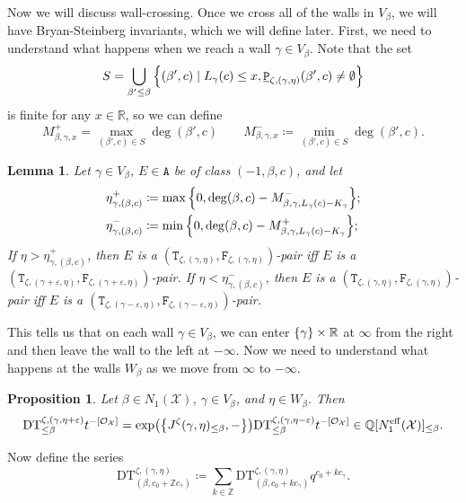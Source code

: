 \documentclass{amsart}
\newtheorem{prop}[thm]{Proposition}
\newtheorem{lem}[thm]{Lemma}
\theoremstyle{definition}
\theoremstyle{remark}
\theoremstyle{plain}
\theoremstyle{definition}
\theoremstyle{remark}
\newcommand{\R}{\mathbb{R}}
\newcommand{\Z}{\mathbb{Z}}
\newcommand{\Q}{\mathbb{Q}}
\newcommand{\ep}{\varepsilon}
\newcommand{\mc}[1]{\mathcal{#1}}
\newcommand{\mr}[1]{\mathrm{#1}}
\newcommand{\mt}[1]{\mathtt{#1}}
\newcommand{\ul}[1]{\underline{#1}}
\newcommand{\1}{\mathbf{1}}
\newcommand{\2}{\mathbf{2}}
\newcommand{\3}{\mathbf{3}}
\begin{document}
Now we will discuss wall-crossing. Once we cross all of the walls in $V_{\beta}$, we will have Bryan-Steinberg invariants, which we will define later. First, we need to understand what happens when we reach a wall $\gamma \in V_{\beta}$. Note that the set 
\[ S = \bigcup_{\beta' \leq \beta} \qty{(\beta', c) \mid L_{\gamma}(c) \leq x, \mt{\ul{P}}_{\zeta, (\gamma,\eta)}(\beta',c) \neq \emptyset} \]
is finite for any $x \in \R$, so we can define
\[ M_{\beta,\gamma,x}^+ = \max_{(\beta',c) \in S} \deg(\beta',c) \qquad M_{\beta, \gamma,x}^- \coloneqq \min_{(\beta',c) \in S} \deg(\beta', c). \]

\begin{lem}
    Let $\gamma \in V_{\beta}$, $E \in \mt{A}$ be of class $(-1, \beta, c)$, and let
    \begin{align*}
        \eta_{\gamma, (\beta,c)}^+ &\coloneqq \max \qty{0, \deg(\beta, c) - M^-_{\beta, \gamma,L_{\gamma}(c) - K_{\gamma}}}; \\
        \eta_{\gamma, (\beta,c)}^- &\coloneqq \min \qty{0, \deg(\beta, c) - M^+_{\beta, \gamma,L_{\gamma}(c) - K_{\gamma}}};
    \end{align*}
    If $\eta > \eta^+_{\gamma, (\beta, c)}$, then $E$ is a $(\mt{T}_{\zeta, (\gamma, \eta)}, \mt{F}_{\zeta, (\gamma,\eta)})$-pair iff $E$ is a $(\mt{T}_{\zeta, (\gamma+\ep, \eta)}, \mt{F}_{\zeta, (\gamma + \ep,\eta)})$-pair. If $\eta < \eta^-_{\gamma, (\beta, c)}$, then $E$ is a $(\mt{T}_{\zeta, (\gamma, \eta)}, \mt{F}_{\zeta, (\gamma,\eta)})$-pair iff $E$ is a $(\mt{T}_{\zeta, (\gamma-\ep, \eta)}, \mt{F}_{\zeta, (\gamma - \ep,\eta)})$-pair.
\end{lem}

This tells us that on each wall $\gamma \in V_{\beta}$, we can enter $\qty{\gamma} \times \R$ at $\infty$ from the right and then leave the wall to the left at $-\infty$. Now we need to understand what happens at the walls $W_{\beta}$ as we move from $\infty$ to $-\infty$.

\begin{prop}
    Let $\beta \in N_1(\mc{X})$, $\gamma \in V_{\beta}$, and $\eta \in W_{\beta}$. Then
    \[ \mr{DT}_{\leq \beta}^{\zeta, (\gamma, \eta + \ep)} t^{-[\mc{O}_{\mc{X}}]} = \exp(\qty{J^{\zeta}(\gamma,\eta)_{\leq \beta}, -}) \mr{DT}_{\leq \beta}^{\zeta, (\gamma, \eta-\ep)} t^{-[\mc{O}_{\mc{X}}]} \in \Q[N_1^{\mr{eff}}(\mc{X})]_{\leq \beta}. \]
\end{prop}

Now define the series
\[ \mr{DT}_{(\beta, c_0 + \Z c_{\gamma})}^{\zeta, (\gamma, \eta)} \coloneqq \sum_{k \in \Z} \mr{DT}_{(\beta, c_0 + kc_{\gamma})}^{\zeta, (\gamma,\eta)} q^{c_0 + kc_{\gamma}}. \]
\end{document}
